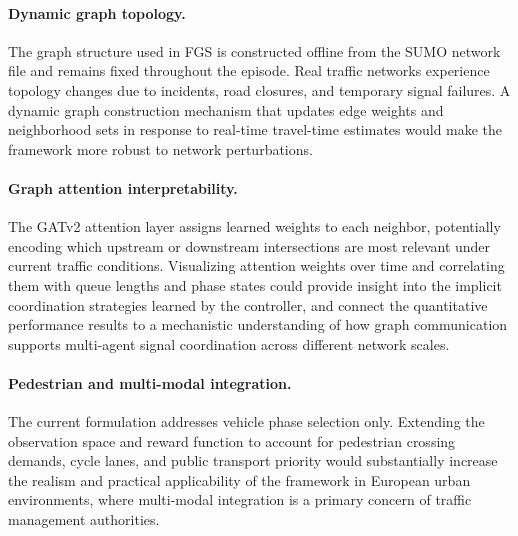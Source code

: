 \paragraph{Dynamic graph topology.}
The graph structure used in FGS is constructed offline from the SUMO network file and remains fixed throughout the episode. Real traffic networks experience topology changes due to incidents, road closures, and temporary signal failures. A dynamic graph construction mechanism that updates edge weights and neighborhood sets in response to real-time travel-time estimates would make the framework more robust to network perturbations.

\paragraph{Graph attention interpretability.}
The GATv2 attention layer assigns learned weights to each neighbor, potentially encoding which upstream or downstream intersections are most relevant under current traffic conditions. Visualizing attention weights over time and correlating them with queue lengths and phase states could provide insight into the implicit coordination strategies learned by the controller, and connect the quantitative performance results to a mechanistic understanding of how graph communication supports multi-agent signal coordination across different network scales.

\paragraph{Pedestrian and multi-modal integration.}
The current formulation addresses vehicle phase selection only. Extending the observation space and reward function to account for pedestrian crossing demands, cycle lanes, and public transport priority would substantially increase the realism and practical applicability of the framework in European urban environments, where multi-modal integration is a primary concern of traffic management authorities.
